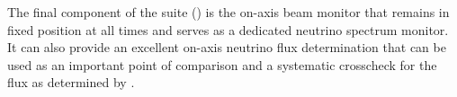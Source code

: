 The final component of the   suite () is the on-axis beam monitor that remains in fixed position at all times and serves as a dedicated neutrino spectrum monitor. 
It can also provide an excellent on-axis neutrino flux determination that can be used as an important point of comparison and a systematic crosscheck for the flux as determined by .


